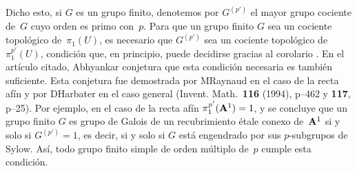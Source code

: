 {\begin{remarqueMR}
Dicho esto, si $G$ es un grupo finito, denotemos por $G^{(p')}$ el mayor
grupo cociente de~$G$ cuyo orden es primo con~$p$. Para que un grupo finito $G$
sea un cociente topológico de~$\pi_1(U)$, es necesario que $G^{(p')}$ sea
un cociente topológico de~$\pi_1^{p'}(U)$, condición que, en principio,
puede decidirse gracias al corolario .
En el artículo citado, Abhyankar conjetura que esta condición necesaria es
también suficiente. Esta conjetura fue demostrada por M\ptbl Raynaud en el
caso de la recta afín y por D\ptbl Harbater en el caso general
(Invent. Math.\ \textbf{116} (1994), p--462 y \textbf{117},
p--25). Por ejemplo, en el caso de la recta afín
$\pi_1^{p'}(\AA^1)=1$, y se concluye que un grupo finito $G$ es grupo de
Galois de un recubrimiento étale conexo de~$\AA^1$ si y solo si
$G^{(p')} = 1$, es decir, si y solo si $G$ está engendrado por sus
$p$-subgrupos de Sylow. Así, todo grupo finito simple de orden múltiplo
de~$p$ cumple esta condición.
\end{remarqueMR}}
